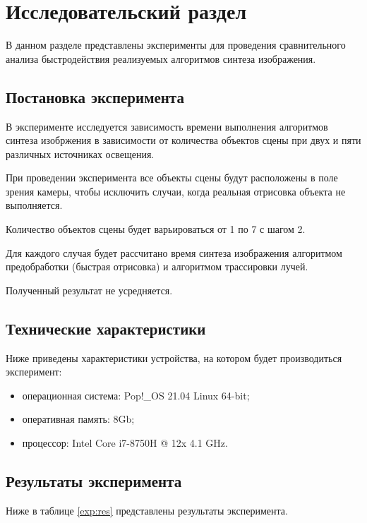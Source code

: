 \chapter{Исследовательский раздел}

В данном разделе представлены эксперименты для проведения сравнительного анализа быстродействия реализуемых алгоритмов синтеза изображения.

\section{Постановка эксперимента}

В эксперименте исследуется зависимость времени выполнения алгоритмов синтеза изобржения в зависимости от количества объектов сцены при двух и пяти различных источниках освещения.

При проведении эксперимента все объекты сцены будут расположены в поле зрения камеры, чтобы исключить случаи, когда реальная отрисовка объекта не выполняется.

Количество объектов сцены будет варьироваться от 1 по 7 с шагом 2.

Для каждого случая будет рассчитано время синтеза изображения алгоритмом предобработки (быстрая отрисовка) и алгоритмом трассировки лучей.

Полученный результат не усредняется.

\section{Технические характеристики}

Ниже приведены характеристики устройства, на котором будет производиться эксперимент:

\begin{itemize}
    \item операционная система: Pop!\_OS 21.04 \cite{pop} Linux 64-bit;
    \item оперативная память: 8Gb;
    \item процессор: Intel Core i7-8750H @ 12x 4.1 GHz.
\end{itemize}

\section{Результаты эксперимента}

Ниже в таблице \ref{exp:res} представлены результаты эксперимента.


